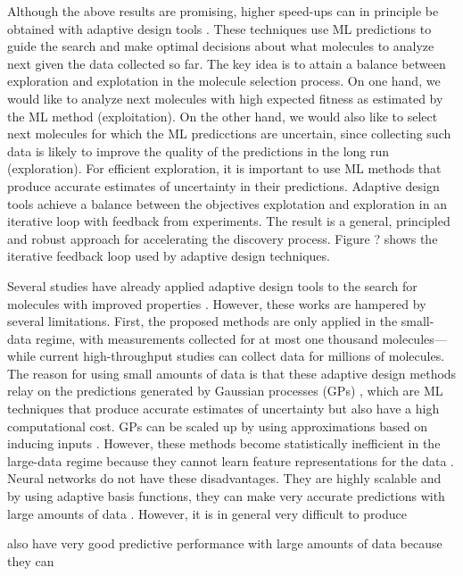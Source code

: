 \documentclass{pnastwo}
\begin{document}
\begin{article}
Although the above results are promising, higher speed-ups can in principle be
obtained with adaptive design tools \cite{jones1998efficient}. These techniques
use ML predictions to guide the search and make optimal decisions about what
molecules to analyze next given the data collected so far. The key idea is to
attain a balance between exploration and explotation in the molecule selection
process. On one hand, we would like to analyze next molecules with high
expected fitness as estimated by the ML method (exploitation). On the other
hand, we would also like to select next molecules for which the ML predicctions
are uncertain, since collecting such data is likely to improve the quality of
the predictions in the long run (exploration). For efficient
exploration, it is important to use ML methods that produce accurate
estimates of uncertainty in their predictions. 
Adaptive design tools achieve a balance
between the objectives explotation and exploration in an iterative loop with
feedback from experiments. 
The result is a general, principled and robust
approach for accelerating the discovery process. 
Figure ? shows the iterative
feedback loop used by adaptive design techniques.

Several studies have already applied adaptive design tools to the search for
molecules with improved properties
\cite{xue2016accelerated,negoescu2011knowledge,de2008active}. However, these
works are hampered by several limitations. First, the proposed methods are only
applied in the small-data regime, with measurements collected for at most one
thousand molecules---while current high-throughput studies can collect data for
millions of molecules. The reason for using small amounts of data is that these
adaptive design methods relay on the predictions generated by Gaussian
processes (GPs) \cite{rasmussen2006gaussian}, which are ML techniques that
produce accurate estimates of uncertainty but also have a high computational
cost. GPs can be scaled up by using approximations based on inducing inputs
\cite{snelson2005sparse,hensman2015scalable}. However, these methods become
statistically inefficient in the large-data regime because they cannot learn
feature representations for the data \cite{bengio2007scaling}.
Neural networks do not have these disadvantages. They are highly scalable and
by using adaptive basis functions, they can make very accurate predictions with
large amounts of data \cite{lecun2015deep}. However, it is in general very
difficult to produce

also have very good predictive performance
with large amounts of data because they can


\end{article}
\end{document}

